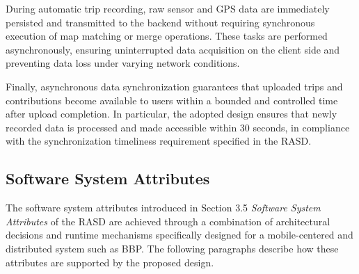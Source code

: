 During automatic trip recording, raw sensor and GPS data are immediately persisted and transmitted to the backend without requiring synchronous execution of map matching or merge operations. These tasks are performed asynchronously, ensuring uninterrupted data acquisition on the client side and preventing data loss under varying network conditions.

Finally, asynchronous data synchronization guarantees that uploaded trips and contributions become available to users within a bounded and controlled time after upload completion. In particular, the adopted design ensures that newly recorded data is processed and made accessible within 30 seconds, in compliance with the synchronization timeliness requirement specified in the RASD.


\subsection{Software System Attributes}
\label{subsec:software_system_attributes}

The software system attributes introduced in Section 3.5 \textit{Software System Attributes} of the RASD are achieved through a combination of architectural decisions and runtime mechanisms specifically designed for a mobile-centered and distributed system such as BBP. The following paragraphs describe how these attributes are supported by the proposed design.

